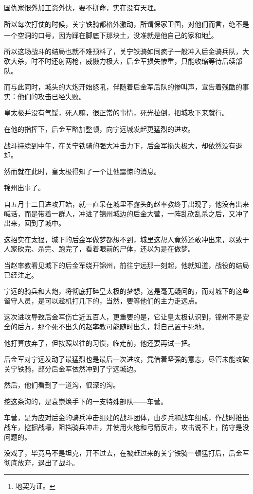 \begin{multicols}{\theparacolNo}
		国仇家恨外加工资外快，要不拼命，实在没有天理。

		所以每次打仗的时候，关宁铁骑都格外激动，所谓保家卫国，对他们而言，绝不是一个空洞的口号，因为踩在脚底下那块土，没准就是他自己的家和地\footnote{地契为证。}。

		所以这场战斗的结局也就不难预料了，关宁铁骑如同疯子一般冲入后金骑兵队，大砍大杀，时不时还射两枪，威慑力极大，后金军损失惨重，只能收缩等待后续部队。

		而与此同时，城头的大炮开始怒吼，伴随着后金军后队的惨叫声，宣告着残酷的事实：他们的攻击已经失败。

		皇太极并没有气馁，死人嘛，很正常的事情，死光拉倒，把城攻下来就行。

		在他的指挥下，后金军略加整顿，向宁远城发起更猛烈的进攻。

		战斗持续到中午，在关宁铁骑的强大冲击力下，后金军损失极大，却依然没有退却。

		然而就在此时，皇太极得知了一个让他震惊的消息。

		锦州出事了。

		自五月十二日进攻开始，就一直呆在城里不露头的赵率教终于出现了，他没有出来喊话，而是带着一群人，冲进了锦州城边的后金大营，一阵乱砍乱杀之后，又冲了出来，回到了城中。

		这招实在太狠，城下的后金军做梦都想不到，城里这帮人竟然还敢冲出来，以致于人家砍完、杀完、跑完了，看着眼前的尸体，还以为是在做梦。

		当赵率教看见城下的后金军绕开锦州，前往宁远那一刻起，他就知道，战役的结局已经注定。

		宁远的骑兵和大炮，将彻底打碎皇太极的梦想，这是毫无疑问的，而对城下的这些留守人员，是可以趁机打几下的，当然，要等他们的主力走远点。

		这次进攻导致后金军伤亡近五百人，更重要的是，它让皇太极认识到，锦州不是安全的后方，那个死不出头的赵率教可能随时出头，将自己置于死地。

		他打算放弃了，但按照以往的习惯，临走前，他还要再试一把。

		后金军对宁远发动了最猛烈也是最后一次进攻，凭借着坚强的意志，尽管未能攻破关宁铁骑，部分后金军依然冲到了宁远城边。

		然后，他们看到了一道沟，很深的沟。

		挖这条沟的，是袁崇焕手下的一支特殊部队——车营。

		车营，是为应对后金的骑兵冲击组建的战斗团体，由步兵和战车组成，作战时推出战车，挖掘战壕，阻挡骑兵冲击，并使用火枪和弓箭反击，攻击说不上，防守是没问题的。

		没戏了，毕竟马不是坦克，开不过去，在被赶过来的关宁铁骑一顿猛打后，后金军彻底放弃，退出了战斗。


\end{multicols}
